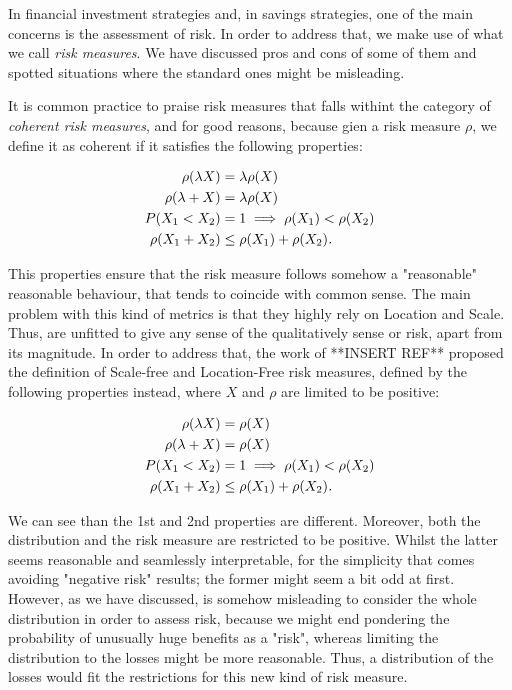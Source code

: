 In financial investment strategies and, in savings strategies, one of the main concerns is the assessment of risk. In order to address that, we make use of what we call \emph{risk measures}. We have discussed pros and cons of some of them and spotted situations where the standard ones might be misleading.

It is common practice to praise risk measures that falls withint the category of \emph{coherent risk measures}, and for good reasons, because gien a risk measure $\rho$, we define it as coherent if it satisfies the following properties:

\begin{align}
\begin{split}
    \rho(\lambda X) &= \lambda \rho (X) \\
    \rho(\lambda  + X) &= \lambda \rho(X) \\
    P(X_1 < X_2) &= 1 \implies \rho(X_1) < \rho(X_2) \\
    \rho(X_1 + X_2) &\leq \rho(X_1) + \rho(X_2) \emph{.}
\end{split}
\end{align}

This properties ensure that the risk measure follows somehow a "reasonable" reasonable behaviour, that tends to coincide with common sense. The main problem with this kind of metrics is that they highly rely on Location and Scale. Thus, are unfitted to give any sense of the qualitatively sense or risk, apart from its magnitude. In order to address that, the work of **INSERT REF** proposed the definition of Scale-free and Location-Free risk measures, defined by the following properties instead, where $X$ and $\rho$ are limited to be positive:

\begin{align}
\begin{split}
    \rho(\lambda X) &= \rho(X) \\
    \rho(\lambda + X) &= \rho(X) \\
    P(X_1 < X_2) &= 1 \implies \rho(X_1) < \rho(X_2) \\
    \rho(X_1 + X_2) &\leq \rho(X_1) + \rho(X_2) \emph{.}
\end{split}
\end{align}

We can see than the 1st and 2nd properties are different. Moreover, both the distribution and the risk measure are restricted to be positive. Whilst the latter seems reasonable and seamlessly interpretable, for the simplicity that comes avoiding "negative risk" results; the former might seem a bit odd at first. However, as we have discussed, is somehow misleading to consider the whole distribution in order to assess risk, because we might end pondering the probability of unusually huge benefits as a "risk", whereas limiting the distribution to the losses might be more reasonable. Thus, a distribution of the losses would fit the restrictions for this new kind of risk measure.

